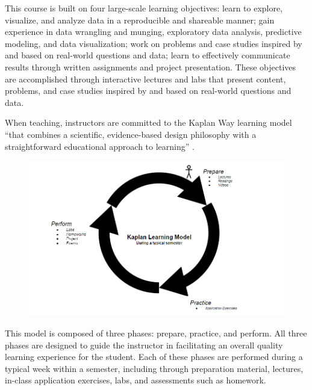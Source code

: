 \documentclass[
  12pt]{article}
\begin{document}
This course is built on four large-scale learning objectives: learn to
explore, visualize, and analyze data in a reproducible and shareable
manner; gain experience in data wrangling and munging, exploratory data
analysis, predictive modeling, and data visualization; work on problems
and case studies inspired by and based on real-world questions and data;
learn to effectively communicate results through written assignments and
project presentation. These objectives are accomplished through
interactive lectures and labs that present content, problems, and case
studies inspired by and based on real-world questions and data.

When teaching, instructors are committed to the Kaplan Way learning
model ``that combines a scientific, evidence-based design philosophy
with a straightforward educational approach to learning'' \citep[pg.
3]{schweser_2023}.

\begin{figure}

{\centering \includegraphics{images/Kaplan.png}

}

\end{figure}

This model is composed of three phases: prepare, practice, and perform.
All three phases are designed to guide the instructor in facilitating an
overall quality learning experience for the student. Each of these
phases are performed during a typical week within a semester, including
through preparation material, lectures, in-class application exercises,
labs, and assessments such as homework.
\end{document}

